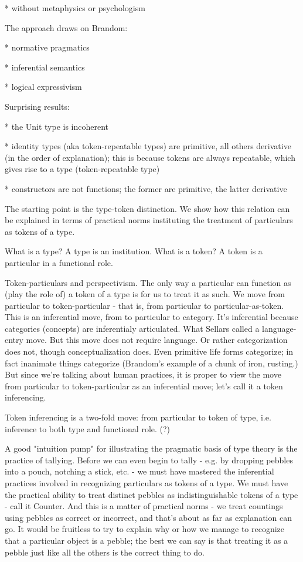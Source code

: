 \documentclass{article}
\begin{document}
    * without metaphysics or psychologism

The approach draws on Brandom:

    * normative pragmatics

    * inferential semantics

    * logical expressivism

Surprising results:

    *  the Unit type is incoherent

    * identity types (aka token-repeatable types) are primitive, all
       others derivative (in the order of explanation); this is
       because tokens are always repeatable, which gives rise to a
       type (token-repeatable type)

    * constructors are not functions; the former are primitive, the
       latter derivative

The starting point is the type-token distinction.  We show how this
relation can be explained in terms of practical norms instituting the
treatment of particulars as tokens of a type.

What is a type?  A type is an institution.  What is a token?  A token
is a particular in a functional role.


Token-particulars and perspectivism.  The only way a particular can
function as (play the role of) a token of a type is for us to treat it
as such.  We move from particular to token-particular - that is, from
particular to particular-as-token.  This is an inferential move, from
to particular to category.  It's inferential because categories
(concepts) are inferentialy articulated.  What Sellars called a
language-entry move.  But this move does not require language.  Or
rather categorization does not, though conceptualization does.  Even
primitive life forms categorize; in fact inanimate things categorize
(Brandom's example of a chunk of iron, rusting.)  But since we're
talking about human practices, it is proper to view the move from
particular to token-particular as an inferential move; let's call it a
token inferencing.

Token inferencing is a two-fold move: from particular to token of
type, i.e. inference to both type and functional role. (?)


A good "intuition pump" for illustrating the pragmatic basis of type
theory is the practice of tallying.  Before we can even begin to tally
- e.g. by dropping pebbles into a pouch, notching a stick, etc. - we
must have mastered the inferential practices involved in recognizing
particulars as tokens of a type.  We must have the practical ability
to treat distinct pebbles as indistinguishable tokens of a type - call
it Counter.  And this is a matter of practical norms - we treat
countings using pebbles as correct or incorrect, and that's about as
far as explanation can go.  It would be fruitless to try to explain
why or how we manage to recognize that a particular object is a
pebble; the best we can say is that treating it as a pebble just like
all the others is the correct thing to do.
\end{document}
